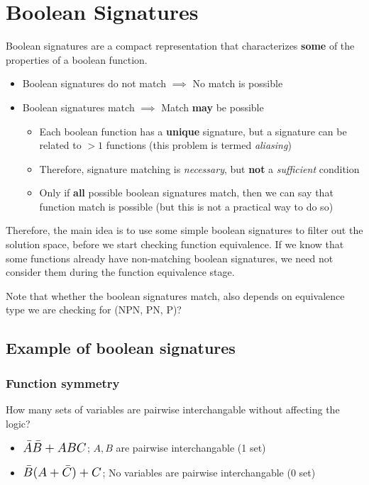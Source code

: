 \documentclass{article}
\newcommand*{\Scale}[2][4]{\scalebox{#1}{\ensuremath{#2}}}%
\begin{document}
\section{Boolean Signatures}
Boolean signatures are a compact representation that characterizes \textbf{some} of the properties of a boolean function.

\begin{itemize}
    \item Boolean signatures do not match $\implies$ No match is possible
    \item Boolean signatures match $\implies$ Match \textbf{may} be possible
        \begin{itemize}
            \item Each boolean function has a \textbf{unique} signature, but a signature can be related to $>1$ functions (this problem is termed \textit{aliasing})
            \item Therefore, signature matching is \textit{necessary}, but \textbf{not} a \textit{sufficient} condition
            \item Only if \textbf{all} possible boolean signatures match, then we can say that  function match is possible  (but this is not a practical way to do so)
        \end{itemize}
\end{itemize}

Therefore, the main idea is to use some simple boolean signatures to filter out the solution space, before we start checking function equivalence.
If we know that some functions already have non-matching boolean signatures, we need not consider them during the function equivalence stage.

Note that whether the boolean signatures match, also depends on equivalence type we are checking for (NPN, PN, P)?

\newpage
\subsection{Example of boolean signatures}
\subsubsection{Function symmetry}
How many sets of variables are pairwise interchangable without affecting the logic?
\begin{itemize}
    \item $\Scale[1.25]{\bar{A}\bar{B} + ABC}$; $A,B$ are pairwise interchangable (1 set)
    \item $\Scale[1.25]{\bar{B}(A + \bar{C}) + C}$; No variables are pairwise interchangable (0 set)
\end{itemize}
\end{document}
